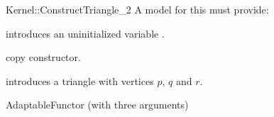 \begin{ccRefFunctionObjectConcept}{Kernel::ConstructTriangle_2}
A model for this must provide:


\ccHidden {}
             {introduces an uninitialized variable .}

\ccHidden {}
            {copy constructor.}


            {introduces a triangle  with vertices $p$,  $q$ and $r$.}

\ccRefines
AdaptableFunctor (with three arguments)

\ccSeeAlso
{}\\

\end{ccRefFunctionObjectConcept}
